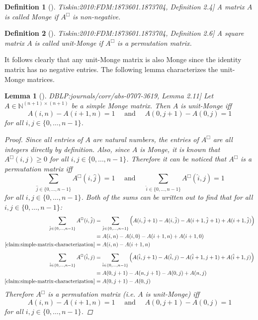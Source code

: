 \documentclass[twoside,11pt,openright]{report}
\newcommand{\refbook}[2]{\cite[#1]{DBLP:journals/corr/abs-0707-3619}, #2}
\newcommand{\reftiskin}[2]{\cite[#1]{Tiskin:2010:FDM:1873601.1873704}, #2}
\newtheorem{mydef}{Definition}
\newtheorem{lemma}{Lemma}
\begin{document}
%
\begin{mydef}[\reftiskin{p. 1288}{Definition 2.4}]
  A matrix $A$ is called Monge if $A^{\Box}$ is non-negative.
\end{mydef}
\begin{mydef}[\reftiskin{p. 1288}{Definition 2.6}]
  \label{def:unit-monge}
  A square matrix $A$ is called unit-Monge if $A^{\Box}$ is a permutation matrix.
\end{mydef}
It follows clearly that any unit-Monge matrix is also Monge since the identity matrix has no negative entries. The following lemma characterizes the unit-Monge matrices.
\begin{lemma}[\refbook{p. 10}{Lemma 2.11}]
  \label{lemma:unit-monge-characterization}
  Let $A \in \mathbb{N}^{(n + 1) \times (n + 1)}$ be a simple Monge matrix. Then $A$ is unit-Monge iff
  \[
    A(i, n) - A(i + 1, n) = 1 \quad \text{ and } \quad A(0, j + 1) - A(0, j) = 1
  \]
  for all $i, j \in \{0, \dots, n - 1\}$.
  \begin{proof}
    Since all entries of $A$ are natural numbers, the entries of $A^{\Box}$ are all integers directly by definition. Also, since $A$ is Monge, it is known that $A^{\Box}(i, j) \geq 0$ for all $i, j \in \{0, \dots, n - 1\}$. Therefore it can be noticed that $A^{\Box}$ is a permutation matrix iff
    \[
      \sum_{\hat{j} \in \{0, \dots, n - 1\}} A^{\Box}(i, \hat{j}) = 1
      \quad \text{ and } \quad
      \sum_{\hat{i} \in \{0, \dots, n - 1\}} A^{\Box}(\hat{i}, j) = 1
    \]
    for all $i, j \in \{0, \dots, n - 1\}$. Both of the sums can be written out to find that for all $i, j \in \{0, \dots, n - 1\}$:
    \begin{align*}
      \sum_{\hat{j} \in \{0, \dots, n - 1\}} A^{\Box}(i, \hat{j})
        &= \sum_{\hat{j} \in \{0, \dots, n - 1\}} \left( A(i, \hat{j} + 1) - A(i, \hat{j}) - A(i + 1, \hat{j} + 1) + A(i + 1, \hat {j}) \right) \\
        &= A(i, n) - A(i, 0) - A(i + 1, n) + A(i + 1, 0) \\
        \text{\cref{claim:simple-matrix-characterization}} &= A(i, n) - A(i + 1, n)
    \end{align*}
    \begin{align*}
      \sum_{\hat{i} \in \{0, \dots, n - 1\}} A^{\Box}(\hat{i}, j)
        &= \sum_{\hat{i} \in \{0, \dots, n - 1\}} \left( A(\hat{i}, j + 1) - A(\hat{i}, j) - A(\hat{i} + 1, j + 1) + A(\hat{i} + 1, j) \right) \\
        &= A(0, j + 1) - A(n, j + 1) - A(0, j) + A(n, j) \\
        \text{\cref{claim:simple-matrix-characterization}} &= A(0, j + 1) - A(0, j)
    \end{align*}
    Therefore $A^{\Box}$ is a permutation matrix (i.e. $A$ is unit-Monge) iff
    \[
      A(i, n) - A(i + 1, n) = 1 \quad \text{ and } \quad A(0, j + 1) - A(0, j) = 1
    \]
    for all $i, j \in \{0, \dots, n - 1\}$.
  \end{proof}
\end{lemma}
\end{document}
